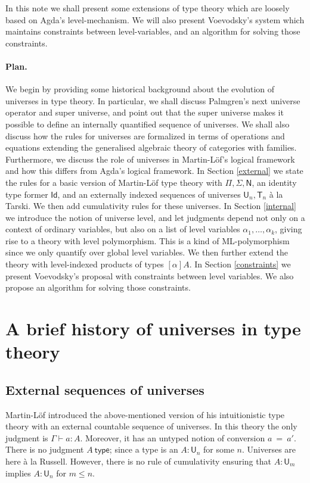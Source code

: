 \documentclass[11pt,a4paper]{article}
\newcommand{\Id}{\mathsf{Id}}
\newcommand{\conv}{=}
\def\NN{\mathsf{N}}
\def\UU{\mathsf{U}}
\newcommand{\type}{\mathsf{type}}
\newcommand{\T}{\mathsf{T}}
\begin{document}
In this note we shall present some extensions of type theory which are loosely based on Agda's level-mechanism. We will also present Voevodsky's system which maintains constraints between level-variables, and an algorithm for solving those constraints.

\paragraph{Plan.} We begin by providing some historical background about the evolution of universes in type theory. In particular, we shall discuss Palmgren's next universe operator and super universe, and point out that the super universe makes it possible to define an internally quantified sequence of universes. We shall also discuss how the rules for universes are formalized in terms of operations and equations extending the generalised algebraic theory of categories with families. Furthermore, we discuss the role of universes in Martin-Löf's logical framework and how this differs from Agda's logical framework. In Section \ref{external} we state the rules for a basic version of Martin-Löf type theory with $\Pi, \Sigma, \NN$, an identity type former $\Id$, and an externally indexed sequences of universes $\UU_n, \T_n$ \`a la Tarski. We then add cumulativity rules for these universes. In Section \ref{internal} we introduce the notion of universe level, and let judgments depend not only on a context of ordinary variables, but also on a list of level variables $\alpha_1, \ldots, \alpha_k$, giving rise to a theory with level polymorphism. This is a kind of ML-polymorphism since we only quantify over global level variables. We then further extend the theory with level-indexed products of types $[\alpha]A$. In Section \ref{constraints} we present Voevodsky's proposal with constraints between level variables. We also propose an algorithm for solving those constraints.

\section{A brief history of universes in type theory}

\subsection{External sequences of universes}

Martin-Löf \cite{martinlof:predicative} introduced the above-mentioned version of his intuitionistic type theory with an external countable sequence of universes. In this theory the only judgment is  $\Gamma \vdash a : A$. Moreover, it has an untyped notion of conversion $a\ \conv\ a'$. There is no judgment $A\ \type$; since a type is an $A : \UU_n$ for some $n$. Universes are here \`a la Russell. However, there is no rule of cumulativity ensuring that $A : \UU_m$ implies $A : \UU_n$ for $m \leq n$.
\end{document}
